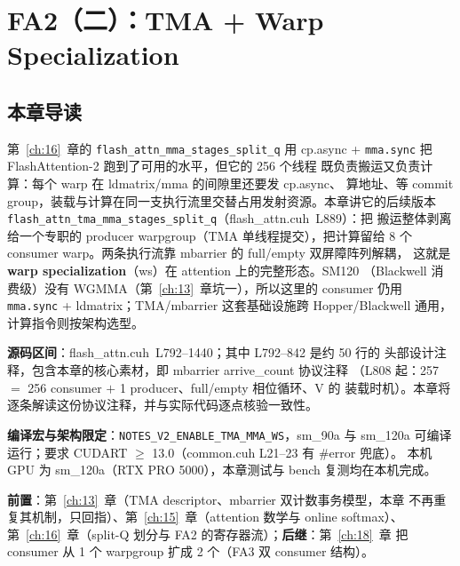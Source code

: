 \chapter{FA2（二）：TMA + Warp Specialization}\label{ch:17}

\section{本章导读}

第~\ref{ch:16}~章的 \texttt{flash\_\allowbreak{}attn\_\allowbreak{}mma\_\allowbreak{}stages\_\allowbreak{}split\_\allowbreak{}q} 用 cp.async +
\texttt{mma.sync} 把 FlashAttention-2 跑到了可用的水平，但它的 256 个线程
既负责搬运又负责计算：每个 warp 在 ldmatrix/mma 的间隙里还要发 cp.async、
算地址、等 commit group，装载与计算在同一支执行流里交替占用发射资源。本章讲它的后续版本
\texttt{flash\_\allowbreak{}attn\_\allowbreak{}tma\_\allowbreak{}mma\_\allowbreak{}stages\_\allowbreak{}split\_\allowbreak{}q}（flash\_attn.cuh~L889）：把
搬运整体剥离给一个专职的 producer warpgroup（TMA 单线程提交），把计算留给
8 个 consumer warp。两条执行流靠 mbarrier 的 full/empty 双屏障阵列解耦，
这就是 \textbf{warp specialization}（ws）在 attention 上的完整形态。SM120
（Blackwell 消费级）没有 WGMMA（第~\ref{ch:13}~章坑一），所以这里的 consumer
仍用 \texttt{mma.sync} + ldmatrix；TMA/mbarrier 这套基础设施跨 Hopper/Blackwell
通用，计算指令则按架构选型。

\textbf{源码区间}：flash\_attn.cuh~L792--1440；其中 L792--842 是约 50 行的
头部设计注释，包含本章的核心素材，即 mbarrier arrive\_count 协议注释
（L808 起：257 $=$ 256 consumer $+$ 1 producer、full/empty 相位循环、V 的
装载时机）。本章将逐条解读这份协议注释，并与实际代码逐点核验一致性。

\textbf{编译宏与架构限定}：\texttt{NOTES\_\allowbreak{}V2\_\allowbreak{}ENABLE\_\allowbreak{}TMA\_\allowbreak{}MMA\_\allowbreak{}WS}，sm\_90a 与
sm\_120a 可编译运行；要求 CUDART $\ge$ 13.0（common.cuh L21--23 有 \#error 兜底）。
本机 GPU 为 sm\_120a（RTX PRO 5000），本章测试与 bench 复测均在本机完成。

\textbf{前置}：第~\ref{ch:13}~章（TMA descriptor、mbarrier 双计数事务模型，本章
不再重复其机制，只回指）、第~\ref{ch:15}~章（attention 数学与 online softmax）、
第~\ref{ch:16}~章（split-Q 划分与 FA2 的寄存器流）；\textbf{后继}：第~\ref{ch:18}~章
把 consumer 从 1 个 warpgroup 扩成 2 个（FA3 双 consumer 结构）。

